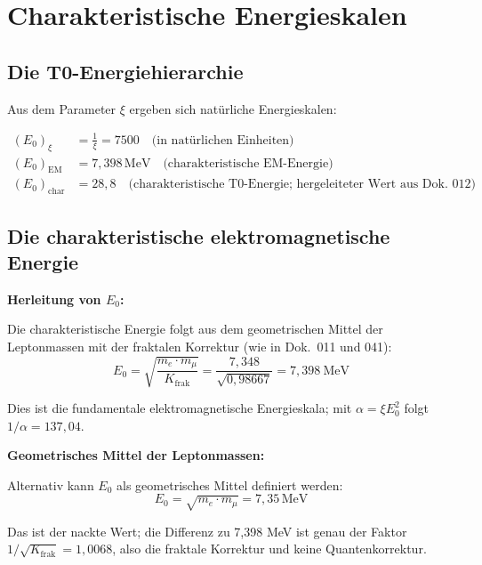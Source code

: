 	\section{Charakteristische Energieskalen}
	
	\subsection{Die T0-Energiehierarchie}
	
	Aus dem Parameter $\xi$ ergeben sich natürliche Energieskalen:
	
	\begin{align}
		(E_0)_{\xi} &= \frac{1}{\xi} = 7500 \quad \text{(in natürlichen Einheiten)} \\
		(E_0)_{\text{EM}} &= 7{,}398\,\mathrm{MeV} \quad \text{(charakteristische EM-Energie)} \\
		(E_0)_{\text{char}} &= 28{,}8 \quad \text{(charakteristische T0-Energie; hergeleiteter Wert aus Dok.~012)}
	\end{align}
	
	\subsection{Die charakteristische elektromagnetische Energie}
	
	\begin{keyresult}
		\textbf{Herleitung von $E_0$:}
		
		Die charakteristische Energie folgt aus dem geometrischen Mittel der Leptonmassen mit der fraktalen Korrektur (wie in Dok.~011 und 041):
		\begin{equation}
			E_0 = \sqrt{\frac{m_e \cdot m_\mu}{K_{\text{frak}}}} = \frac{7{,}348}{\sqrt{0{,}98667}} = 7{,}398\ \text{MeV}
		\end{equation}

		Dies ist die fundamentale elektromagnetische Energieskala; mit $\alpha = \xi E_0^2$ folgt $1/\alpha = 137{,}04$.
	\end{keyresult}
	
	\begin{alternative}
		\textbf{Geometrisches Mittel der Leptonmassen:}
		
		Alternativ kann $E_0$ als geometrisches Mittel definiert werden:
		\begin{equation}
			E_0 = \sqrt{m_e \cdot m_\mu} = 7{,}35\,\mathrm{MeV}
		\end{equation}
		
		Das ist der nackte Wert; die Differenz zu 7{,}398 MeV ist genau der Faktor $1/\sqrt{K_{\text{frak}}} = 1{,}0068$, also die fraktale Korrektur und keine Quantenkorrektur.
	\end{alternative}
	

